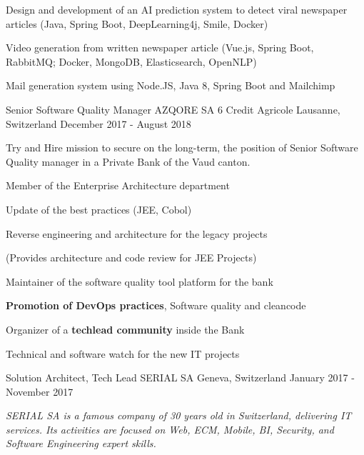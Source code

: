 \begin{cventries}
{\begin{cvitems}
            \item{Design and development of an AI prediction system to detect viral newspaper articles (Java, Spring Boot, DeepLearning4j, Smile, Docker)}
            \item{Video generation from written newspaper article (Vue.js, Spring Boot, RabbitMQ; Docker, MongoDB, Elasticsearch, OpenNLP)}
            \item{Mail generation system using Node.JS, Java 8, Spring Boot and Mailchimp}
        \end{cvitems}
    }
    \cventry
    {Senior Software Quality Manager} %
    {AZQORE SA 6 Credit Agricole} %
    {Lausanne, Switzerland} %
    {December 2017 - August 2018} %
    {
        \begin{cvitems} %
            \item {Try and Hire mission to secure on the long-term, the position of Senior Software Quality manager in a Private Bank of the Vaud canton.}
            \item{Member of the Enterprise Architecture department}
            \item{Update of the best practices (JEE, Cobol)}
            \item{Reverse engineering and architecture for the legacy projects}
            \item(Provides architecture and code review for JEE Projects)
            \item {Maintainer of the software quality tool platform for the bank}
            \item {\textbf{Promotion of DevOps practices}, Software quality and cleancode}
            \item {Organizer of a \textbf{techlead community }inside the Bank}
            \item {Technical and software watch for the new IT projects}
        \end{cvitems}
    }
    \cventry
    {Solution Architect, Tech Lead} %
    {SERIAL SA} %
    {Geneva, Switzerland} %
    {January 2017 - November 2017} %
    {
        \begin{cvitems} %
            \item {\textit{SERIAL SA is a famous company of 30 years old in Switzerland, delivering IT services. Its activities are focused on Web, ECM, Mobile, BI, Security, and Software Engineering expert skills.}}

\end{cvitems}}
\end{cventries}

